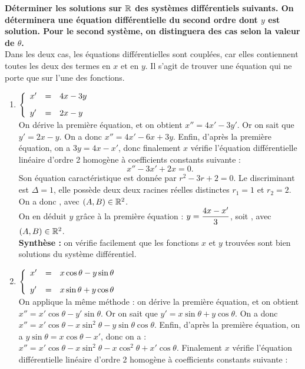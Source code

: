 \documentclass[a4paper, 11pt,reqno]{article}
\begin{document}
\begin{correction}  \;
\textbf{D\'eterminer les solutions sur $\mathbb{R}$ des syst\`emes diff\'erentiels suivants. On d\'eterminera une \'equation diff\'erentielle du second ordre dont $y$ est solution. Pour le second syst\`eme, on distinguera des cas selon la valeur de $\theta$.}\\
Dans les deux cas, les \'equations diff\'erentielles sont coupl\'ees, car elles contiennent toutes les deux des termes en $x$ et en $y$. Il s'agit de trouver une \'equation qui ne porte que sur l'une des fonctions.
\begin{enumerate}
\item $\mathbf{\left\lbrace\begin{array}{lll} 
x^{\prime}&=& 4x-3y\vsec\\
y^{\prime}&=& 2x-y     
\end{array}\right.}$\\
On d\'erive la premi\`ere \'equation, et on obtient $x''=4x'-3y'$. Or on sait que $y'=2x-y$. On a donc $x''=4x'-6x+3y$. Enfin, d'apr\`es la premi\`ere \'equation, on a $3y = 4x-x'$, donc finalement $x$ v\'erifie l'\'equation diff\'erentielle lin\'eaire d'ordre 2 homog\`ene \`a coefficients constants suivante :
$$x''-3x'+2x=0.$$
Son \'equation caract\'eristique est donn\'ee par $r^2-3r+2=0$. Le discriminant est $\Delta = 1$, elle poss\`ede deux deux racines r\'eelles distinctes $r_1=1$ et $r_2=2$. On a donc , avec $(A,B) \in \mathbb{R}^2$.\\
On en d\'eduit $y$ gr\^ace \`a la premi\`ere \'equation : $y = \displaystyle \frac{4x-x'}{3}$, soit , avec $(A,B) \in \mathbb{R}^2$.\\
\textbf{Synth\`ese :} on v\'erifie facilement que les fonctions $x$ et $y$ trouv\'ees sont bien solutions du syst\`eme diff\'erentiel.
\item $\mathbf{\left\lbrace\begin{array}{lll} 
x^{\prime}&=& x\cos{\theta}-y\sin{\theta}\vsec\\
y^{\prime}&=& x\sin{\theta}+y\cos{\theta}     
\end{array}\right.}$\\
On applique la m\^eme m\'ethode : on d\'erive la premi\`ere \'equation, et on obtient $x''=x'\cos \theta-y'\sin \theta$. Or on sait que $y'=x\sin \theta + y \cos \theta$. On a donc $x''=x'\cos \theta-x\sin^2 \theta-y \sin \theta \cos \theta$. Enfin, d'apr\`es la premi\`ere \'equation, on a $y\sin \theta = x \cos \theta - x'$, donc on a : $x''=x'\cos \theta-x\sin^2 \theta - x \cos^2\theta + x' \cos \theta$. Finalement $x$ v\'erifie l'\'equation diff\'erentielle lin\'eaire d'ordre 2 homog\`ene \`a coefficients constants suivante :

\end{enumerate}
\end{correction}
\end{document}
